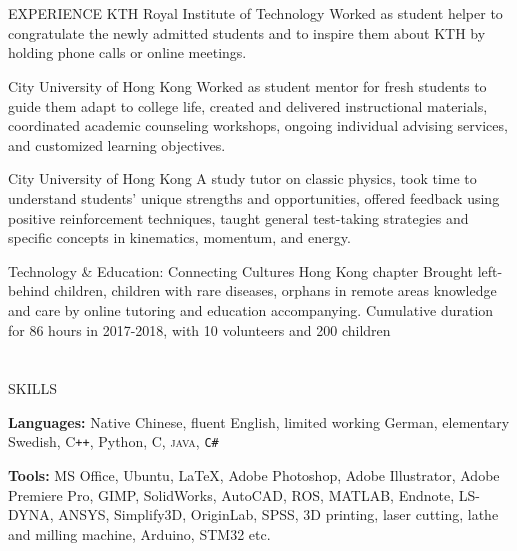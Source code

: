 \documentclass{my_cv}
\begin{document}
\begin{multicols}{2}
\section{\faPencil}{EXPERIENCE}
%
    {KTH Royal Institute of Technology}%
    {Worked as student helper to congratulate the newly admitted students and to inspire them about KTH by holding phone calls or online meetings.}%
   
%
    {City University of Hong Kong}%
    {Worked as student mentor for fresh students to guide them adapt to college life, created and delivered instructional materials, coordinated academic counseling workshops, ongoing individual advising services, and customized learning objectives.}%

%
    {City University of Hong Kong}%
    {A study tutor on classic physics, took time to understand students’ unique strengths and opportunities, offered feedback using positive reinforcement techniques, taught general test-taking strategies and specific concepts in kinematics, momentum, and energy. }%
     
%
    {Technology \& Education: Connecting Cultures Hong Kong chapter}%
    {Brought left-behind children, children with rare diseases, orphans in remote areas knowledge and care by online tutoring and education accompanying. Cumulative duration for 86 hours in 2017-2018, with 10 volunteers and 200 children}%
    
    
    
\section{\faList}{SKILLS}

\textbf{Languages:} Native Chinese, fluent English, limited working German, elementary Swedish, C\texttt{++}, Python, C, \textsc{java}, \texttt{C\#}

\noindent\textbf{Tools:} MS Office, Ubuntu, \LaTeX, Adobe Photoshop, Adobe Illustrator, Adobe Premiere Pro, GIMP, SolidWorks, AutoCAD, ROS, MATLAB, Endnote, LS-DYNA, ANSYS, Simplify3D, OriginLab, SPSS, 3D printing, laser cutting, lathe and milling machine, Arduino, STM32 etc.


\end{multicols}
\end{document}
